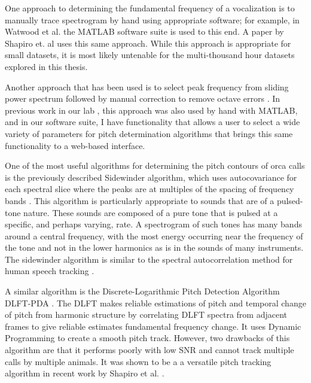 \documentclass[12pt,oneside]{book}
\begin{document}
One approach to determining the fundamental frequency of a
vocalization is to manually trace spectrogram by hand using
appropriate software; for example, in Watwood et
al. \cite{watson2004biodiversity} the MATLAB software suite is used to
this end.  A paper by Shapiro et. al
\cite{shapiro2006signature} uses this same approach.  While this
approach is appropriate for small datasets, it is most likely
untenable for the multi-thousand hour datasets explored in this
thesis.

Another approach that has been used is to select peak frequency from
sliding power spectrum followed by manual correction to remove octave
errors \cite{buck1993quantitative} \cite{janik1994signature}.  In
previous work in our lab \cite{ness2008chants}, this approach was also
used by hand with MATLAB, and in our software suite, I have
functionality that allows a user to select a wide variety of
parameters for pitch determination algorithms that brings this same
functionality to a web-based interface.

One of the most useful algorithms for determining the pitch contours
of orca calls is the previously described Sidewinder algorithm, which
uses autocovariance for each spectral slice where the peaks are at
multiples of the spacing of frequency bands
\cite{deecke1999quantifying}.  This algorithm is particularly
appropriate to sounds that are of a pulsed-tone nature.  These sounds
are composed of a pure tone that is pulsed at a specific, and perhaps
varying, rate.  A spectrogram of such tones has many bands
\cite{watkins1967harmonic} around a central frequency, with the most
energy occurring near the frequency of the tone and not in the lower
harmonics as is in the sounds of many instruments.  The sidewinder
algorithm is similar to the spectral autocorrelation method for human
speech tracking \cite{lahat1987autocorrelation}.

A similar algorithm is the Discrete-Logarithmic Pitch Detection
Algorithm DLFT-PDA \cite{wang2000pitch}.  The DLFT makes reliable
estimations of pitch and temporal change of pitch from harmonic
structure by correlating DLFT spectra from adjacent frames to give
reliable estimates fundamental frequency change.  It uses Dynamic
Programming to create a smooth pitch track.  However, two drawbacks of
this algorithm are that it performs poorly with low SNR and cannot
track multiple calls by multiple animals.  It was shown to be a a
versatile pitch tracking algorithm in recent work by Shapiro et
al. \cite{shapiro2009pitch}.
\end{document}
